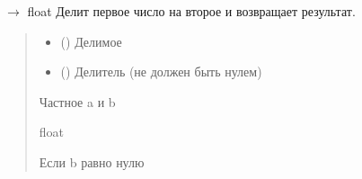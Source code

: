 \documentclass[letterpaper,10pt,russian]{sphinxmanual}
\begin{document}
\begin{fulllineitems}
\label{\detokenize{Calculator:Calculator.divide}}
\pysigstartsignatures
\pysiglinewithargsret
{}
{\sphinxparamcomma {}}
{{ $\rightarrow$ float}}
\pysigstopsignatures
\sphinxAtStartPar
Делит первое число на второе и возвращает результат.
\begin{quote}\begin{description}
\begin{itemize}
\item {} 
\sphinxAtStartPar
{} () \textendash{} Делимое

\item {} 
\sphinxAtStartPar
{} () \textendash{} Делитель (не должен быть нулем)

\end{itemize}

\sphinxAtStartPar
Частное a и b

\sphinxAtStartPar
float

\sphinxAtStartPar
{} \textendash{} Если b равно нулю

\end{description}\end{quote}
\begin{description}
\begin{sphinxVerbatim}[commandchars=\\\{\}]
 
\end{sphinxVerbatim}

\end{description}

\end{fulllineitems}

\end{document}
